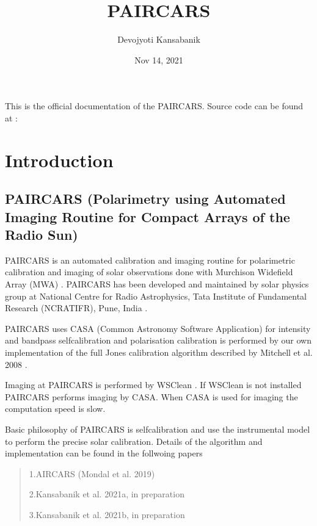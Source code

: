\documentclass[letterpaper,10pt,english]{sphinxmanual}
\title{P\sphinxhyphen{}AIRCARS}
\date{Nov 14, 2021}
\author{Devojyoti Kansabanik}
\begin{document}
\pagestyle{empty}
\sphinxmaketitle
\pagestyle{plain}
\sphinxtableofcontents
\pagestyle{normal}
\label{\detokenize{index::doc}}


\sphinxAtStartPar
This is the official documentation of the P\sphinxhyphen{}AIRCARS. Source code can be found at : 


\chapter{Introduction}
\label{\detokenize{intro:introduction}}\label{\detokenize{intro::doc}}

\section{P\sphinxhyphen{}AIRCARS (Polarimetry using Automated Imaging Routine for Compact Arrays of the Radio Sun)}
\label{\detokenize{intro:p-aircars-polarimetry-using-automated-imaging-routine-for-compact-arrays-of-the-radio-sun}}
\sphinxAtStartPar
P\sphinxhyphen{}AIRCARS is an automated calibration and imaging routine for polarimetric calibration and imaging of solar observations done with Murchison Widefield Array (MWA) . P\sphinxhyphen{}AIRCARS has been developed and maintained by solar physics group at National Centre for Radio Astrophysics, Tata Institute of Fundamental Research (NCRA\sphinxhyphen{}TIFR), Pune, India .

\sphinxAtStartPar
P\sphinxhyphen{}AIRCARS uses CASA (Common Astronomy Software Application)  for intensity and bandpass self\sphinxhyphen{}calibration and polarisation calibration is performed by our own implementation of the full Jones calibration algorithm described by Mitchell et al. 2008 .

\sphinxAtStartPar
Imaging at P\sphinxhyphen{}AIRCARS is performed by WSClean . If WSClean is not installed P\sphinxhyphen{}AIRCARS performs imaging by CASA. When CASA is used for imaging the computation speed is slow.

\sphinxAtStartPar
Basic philosophy of P\sphinxhyphen{}AIRCARS is self\sphinxhyphen{}calibration and use the instrumental model to perform the precise solar calibration. Details of the algorithm and implementation can be found in the follwoing papers
\begin{quote}

\sphinxAtStartPar
1.AIRCARS (Mondal et al. 2019) 

\sphinxAtStartPar
2.Kansabanik et al. 2021a, in preparation

\sphinxAtStartPar
3.Kansabanik et al. 2021b, in preparation
\end{quote}
\end{document}
